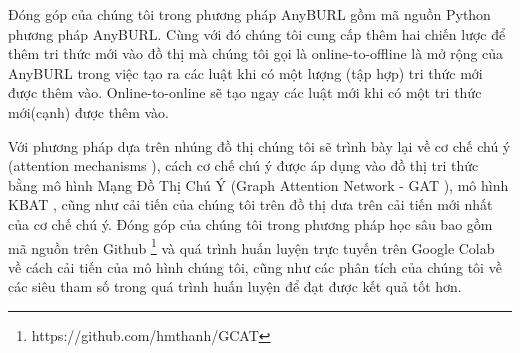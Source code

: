 Đóng góp của chúng tôi trong phương pháp AnyBURL\cite{burl} gồm mã nguồn Python phương pháp AnyBURL. Cùng với đó chúng tôi cung cấp thêm hai chiến lược để thêm tri thức mới vào đồ thị mà chúng tôi gọi là online-to-offline là mở rộng của AnyBURL trong việc tạo ra các luật khi có một lượng (tập hợp) tri thức mới được thêm vào. Online-to-online sẽ tạo ngay các luật mới khi có một tri thức mới(cạnh) được thêm vào.

Với phương pháp dựa trên nhúng đồ thị chúng tôi sẽ trình bày lại về cơ chế chú ý (attention mechanisms \cite{vaswani2017attention}), cách cơ chế chú ý được áp dụng vào đồ thị tri thức bằng mô hình Mạng Đồ Thị Chú Ý (Graph Attention Network - GAT \cite{velivckovic2017graph}), mô hình KBAT \cite{nathani2019learning}, cũng như cải tiến của chúng tôi trên đồ thị dưa trên cải tiến mới nhất của cơ chế chú ý.
Đóng góp của chúng tôi trong phương pháp học sâu bao gồm mã nguồn trên Github \footnote{https://github.com/hmthanh/GCAT} và quá trình huấn luyện trực tuyến trên Google Colab về cách cải tiến của mô hình chúng tôi, cũng như các phân tích của chúng tôi về các siêu tham số trong quá trình huấn luyện để đạt được kết quả tốt hơn.






